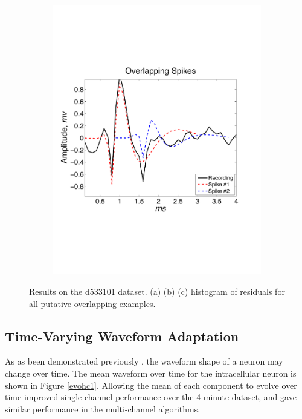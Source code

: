 \begin{center}
\begin{figure}
\begin{subfigure}[b]{.49\textwidth}
\includegraphics[width=\textwidth]{../figs/alloverlappingspikes/olspike3}
\caption{}
\label{overlapping}
\end{subfigure}
\caption{Results on the d533101 dataset.  (a)  (b)  (c) histogram of residuals for all putative overlapping examples.}
\end{figure}
\end{center}



\subsection{Time-Varying Waveform Adaptation} \label{sub:adapt}
As as been demonstrated previously \cite{calabrese2011kalman}, the waveform shape of a neuron may change over time.  The mean waveform over time for the intracellular neuron is shown in Figure \ref{evohc1}.  Allowing the mean of each component to evolve over time improved single-channel performance over the 4-minute dataset, and gave similar performance in the multi-channel algorithms.



